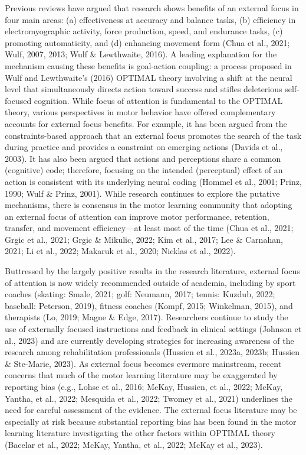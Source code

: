 \documentclass[
  man, donotrepeattitle,floatsintext]{apa7}
\begin{document}
Previous reviews have argued that research shows benefits of an external focus in four main areas: (a) effectiveness at accuracy and balance tasks, (b) efficiency in electromyographic activity, force production, speed, and endurance tasks, (c) promoting automaticity, and (d) enhancing movement form (Chua et al., 2021; Wulf, 2007, 2013; Wulf \& Lewthwaite, 2016). A leading explanation for the mechanism causing these benefits is goal-action coupling: a process proposed in Wulf and Lewthwaite's (2016) OPTIMAL theory involving a shift at the neural level that simultaneously directs action toward success and stifles deleterious self-focused cognition. While focus of attention is fundamental to the OPTIMAL theory, various perspectives in motor behavior have offered complementary accounts for external focus benefits. For example, it has been argued from the constraints-based approach that an external focus promotes the search of the task during practice and provides a constraint on emerging actions (Davids et al., 2003). It has also been argued that actions and perceptions share a common (cognitive) code; therefore, focusing on the intended (perceptual) effect of an action is consistent with its underlying neural coding (Hommel et al., 2001; Prinz, 1990; Wulf \& Prinz, 2001). While research continues to explore the putative mechanisms, there is consensus in the motor learning community that adopting an external focus of attention can improve motor performance, retention, transfer, and movement efficiency---at least most of the time (Chua et al., 2021; Grgic et al., 2021; Grgic \& Mikulic, 2022; Kim et al., 2017; Lee \& Carnahan, 2021; Li et al., 2022; Makaruk et al., 2020; Nicklas et al., 2022).

Buttressed by the largely positive results in the research literature, external focus of attention is now widely recommended outside of academia, including by sport coaches (skating: Smale, 2021; golf: Neumann, 2017; tennis: Kuzdub, 2022; baseball: Peterson, 2019), fitness coaches (Kompf, 2015; Winkelman, 2015), and therapists (Lo, 2019; Magne \& Edge, 2017). Researchers continue to study the use of externally focused instructions and feedback in clinical settings (Johnson et al., 2023) and are currently developing strategies for increasing awareness of the research among rehabilitation professionals (Hussien et al., 2023a, 2023b; Hussien \& Ste-Marie, 2023). As external focus becomes evermore mainstream, recent concerns that much of the motor learning literature may be exaggerated by reporting bias (e.g., Lohse et al., 2016; McKay, Hussien, et al., 2022; McKay, Yantha, et al., 2022; Mesquida et al., 2022; Twomey et al., 2021) underlines the need for careful assessment of the evidence. The external focus literature may be especially at risk because substantial reporting bias has been found in the motor learning literature investigating the other factors within OPTIMAL theory (Bacelar et al., 2022; McKay, Yantha, et al., 2022; McKay et al., 2023).
\end{document}
